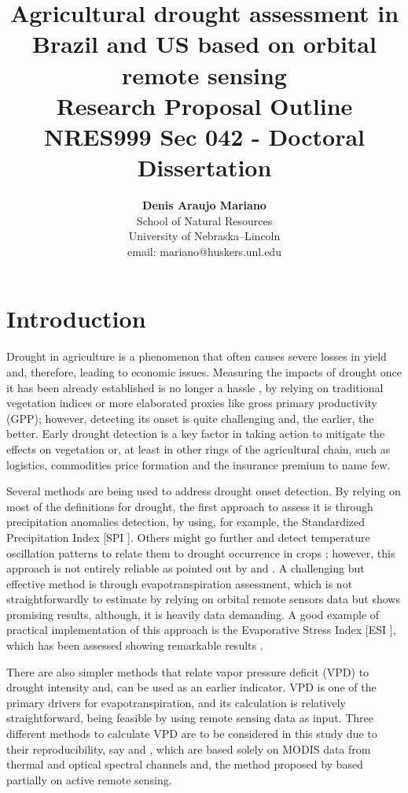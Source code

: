 \documentclass[hidelinks,12pt]{article}
\title{Agricultural drought assessment in Brazil and US based on orbital remote sensing \\ \textbf{Research Proposal Outline} \\ NRES999 Sec 042 - Doctoral Dissertation}
\author{\textbf{Denis Araujo Mariano} \\ 
School of Natural Resources \\ 
University of Nebraska--Lincoln\\ 
email: mariano@huskers.unl.edu}
\begin{document}
\singlespacing %
\maketitle

\doublespacing  %
\setcounter{secnumdepth}{3}


\section{Introduction}
	
	Drought in agriculture is a phenomenon that often causes severe losses in yield and, therefore, leading to economic issues. Measuring the impacts of drought once it has been already established is no longer a hassle \citep{Caccamo2011,Swain2011,Wagle2015a}, by relying on traditional vegetation indices or more elaborated proxies like gross primary productivity (GPP); however, detecting its onset is quite challenging and, the earlier, the better. Early drought detection is a key factor in taking action to mitigate the effects on vegetation or, at least in other rings of the agricultural chain, such as logistics, commodities price formation and the insurance premium to name few.
	
	Several methods are being used to address drought onset detection. By relying on most of the definitions for drought, the first approach to assess it is through precipitation anomalies detection, by using, for example, the Standardized Precipitation Index [SPI \citep{Mckee1993}]. Others might go further and detect temperature oscillation patterns to relate them to drought occurrence in crops \citep{Swain2011}; however, this approach is not entirely reliable as pointed out by \cite{Basso2014} and \cite{Jin2016}. A challenging but effective method is through evapotranspiration assessment, which is not straightforwardly to estimate by relying on orbital remote sensors data but shows promising results, although, it is heavily data demanding. A good example of practical implementation of this approach is the Evaporative Stress Index [ESI \citep{Anderson2007b,Anderson2007c}], which has been assessed showing remarkable results \citep{Otkin2014a}. 
	
	There are also simpler methods that relate vapor pressure deficit (VPD) to drought intensity and, can be used as an earlier indicator. VPD is one of the primary drivers for evapotranspiration, and its calculation is relatively straightforward, being feasible by using remote sensing data as input. Three different methods to calculate VPD are to be considered in this study due to their reproducibility, say \cite{Hashimoto2008} and \cite{Zhang2014b}, which are based solely on MODIS data from thermal and optical spectral channels and, the method proposed by \cite{Behrangi2016} based partially on active remote sensing.   
	
\end{document}
